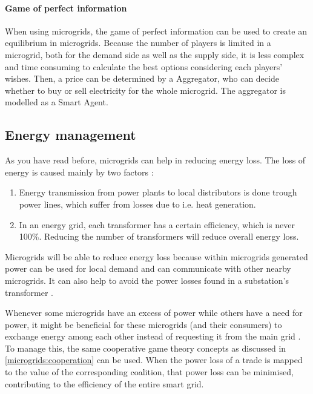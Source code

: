 \paragraph{Game of perfect information}
When using microgrids, the game of perfect information can be used to create an equilibrium in microgrids. Because the number of players is limited in a microgrid, both for the demand side as well as the supply side, it is less complex and time consuming to calculate the best options considering each players' wishes. Then, a price can be determined by a Aggregator, who can decide whether to buy or sell electricity for the whole microgrid. The aggregator is modelled as a Smart Agent\cite{MicrogridModellingPetrosAristidou}.


\subsection{Energy management}
As you have read before, microgrids can help in reducing energy loss. The loss of energy is caused mainly by two factors \cite{EnergyLossURL}: 

\begin{enumerate}
\item Energy transmission from power plants to local distributors is done trough power lines, which suffer from losses due to i.e. heat generation\cite{LasseterPaigi2004}.
\item In an energy grid, each transformer has a certain efficiency, which is never 100\%. Reducing the number of transformers will reduce overall energy loss.
\end{enumerate}

Microgrids will be able to reduce energy loss because within microgrids generated power can be used for local demand and can communicate with other nearby microgrids. It can also help to avoid the power losses found in a substation's transformer \cite{keypaper}.

Whenever some microgrids have an excess of power while others have a need for power, it might be beneficial for these microgrids (and their consumers) to exchange energy among each other instead of requesting it from the main grid \cite{SaadHanPoorEtAl2011}. To manage this, the same cooperative game theory concepts as discussed in \ref{microgrids:cooperation} can be used. When the power loss of a trade is mapped to the value of the corresponding coalition, that power loss can be minimised, contributing to the efficiency of the entire smart grid. 

